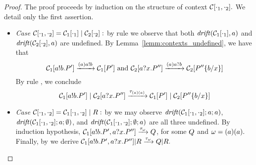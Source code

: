 \begin{proof} 
      The proof proceeds by induction on the structure of context $\mathcal{C}[\cdot_1,\cdot_2].$ We detail only the first assertion.
      \begin{itemize}
      \item \emph{Case}
            $\mathcal{C}[\cdot_1,\cdot_2] = \mathcal{C}_1[\cdot_1]\;|\;\mathcal{C}_2[\cdot_2]:$ 
            by rule  we observe that both $\mathit {drift}(\mathcal{C}_1[\cdot_1],a)$ and $\mathit {drift}(\mathcal{C}_2[\cdot_2],a)$ are undefined.
            By Lemma~\ref{lemm:contexts_undefined}, we have that
            \[
              \mathcal{C}_1[a!b.P'] \xrightarrow{(a)a!b}\mathcal{C}_1[P'] \text{ and }
              \mathcal{C}_2[a?x.P''] \xrightarrow{(a)a?b}\mathcal{C}_2[P'' \{b/x\}]
            \]
            By rule , we conclude 
            \[
              \mathcal{C}_1[a!b.P'] \;|\;  \mathcal{C}_2[a?x.P''] 
               \xrightarrow{\tau_{(a) (a)}}
              \mathcal{C}_1[P']  \;|\;  \mathcal{C}_2[P'' \{b/x\}]
            \]
             \item \emph{Case}
             $\mathcal{C}[\cdot_1,\cdot_2] = \mathcal{C}_1[\cdot_1, \cdot_2] \;|\; R:$ 
             by  we may observe 
             $\mathit {drift}(\mathcal{C}_1[\cdot_1, \cdot_2];a;a)$, $\mathit {drift}(\mathcal{C}_1[\cdot_1, \cdot_2];a;\emptyset)$,  and $\mathit {drift}(\mathcal{C}_1[\cdot_1, \cdot_2];\emptyset;a)$  are all three undefined. 
             By induction hypothesis, $\mathcal{C}_1[a!b.P',  a?x.P''] \xrightarrow{\tau_\omega} Q$, for some $Q$ and  $\omega= (a) (a).$
             Finally, by  we derive 
             $\mathcal{C}_1[a!b.P',  a?x.P''] | R \xrightarrow{\tau_\omega} Q|R.$

\end{itemize}
\end{proof}
